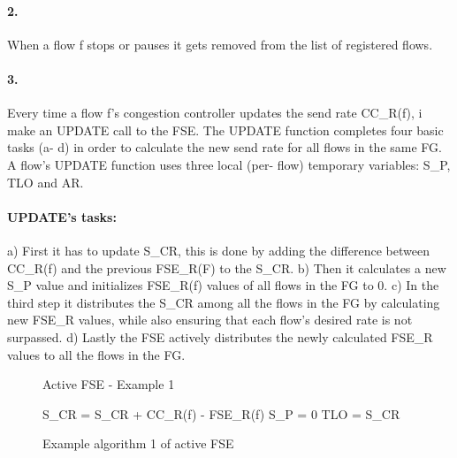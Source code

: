 \paragraph{2.}
When a flow f stops or pauses it gets removed from the list of registered flows.
\paragraph{3.}
Every time a flow f's congestion controller updates the send rate CC\_R(f), i make an UPDATE call to the FSE.
The UPDATE function completes four basic tasks (a- d) in order to calculate the new send rate for all flows in the same FG.
A flow's UPDATE function uses three local (per- flow) temporary variables: S\_P, TLO and AR.
\paragraph{UPDATE's tasks:}
a) First it has to update S\_CR, this is done by adding the difference between CC\_R(f) and the previous FSE\_R(F) to the S\_CR.
b) Then it calculates a new S\_P value and initializes FSE\_R(f) values of all flows in the FG to 0.
c) In the third step it distributes the S\_CR among all the flows in the FG by calculating new FSE\_R values, while also ensuring that each flow's desired rate is not surpassed.
d) Lastly the FSE actively distributes the newly calculated FSE\_R values to all the flows in the FG.

\begin{figure}
\begin{algorithm}[H]
    \SetAlgoLined
    \caption{Active FSE - Example 1}
    S\_CR = S\_CR + CC\_R(f) - FSE\_R(f)\;
    S\_P = 0\;
    TLO = S\_CR\;
\end{algorithm}
\caption{Example algorithm 1 of active FSE}
\label{active-fse-1}
\end{figure}

